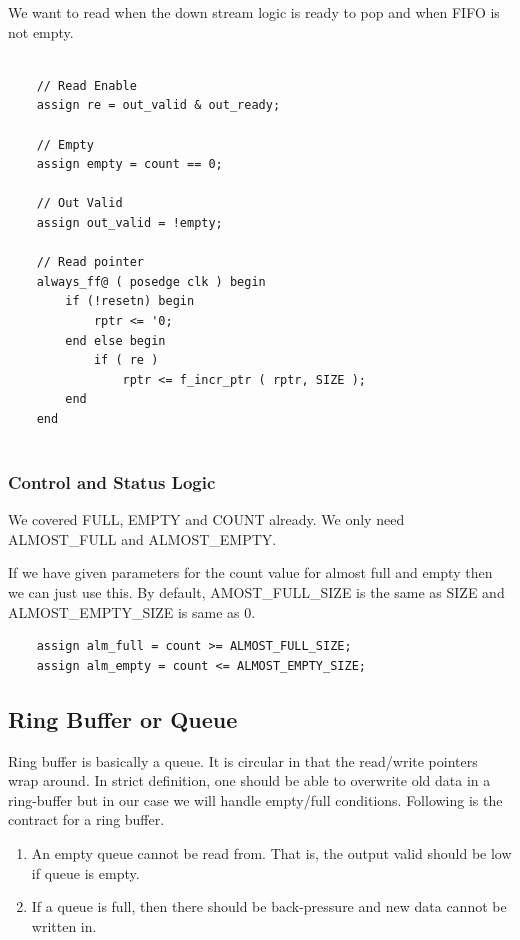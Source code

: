 \documentclass{article}
\begin{document}
We want to read when the down stream logic is ready to pop and when FIFO is not empty.

\begin{Verbatim}

	// Read Enable
	assign re = out_valid & out_ready;
	
	// Empty
	assign empty = count == 0;
	
	// Out Valid
	assign out_valid = !empty;
	
	// Read pointer
	always_ff@ ( posedge clk ) begin 
		if (!resetn) begin
			rptr <= '0;
		end else begin
			if ( re )
				rptr <= f_incr_ptr ( rptr, SIZE );
		end
	end
	
\end{Verbatim}

\subsubsection{Control and Status Logic}

We covered FULL, EMPTY and COUNT already. We only need ALMOST\_FULL and ALMOST\_EMPTY.

If we have given parameters for the count value for almost full and empty then we can just use this. By default, AMOST\_FULL\_SIZE is the same as SIZE and ALMOST\_EMPTY\_SIZE is same as 0.

\begin{Verbatim}
	assign alm_full = count >= ALMOST_FULL_SIZE;
	assign alm_empty = count <= ALMOST_EMPTY_SIZE;
\end{Verbatim}


\subsection{Ring Buffer or Queue}

Ring buffer is basically a queue. It is circular in that the read/write pointers wrap around. In strict definition, one should be able to overwrite old data in a ring-buffer but in our case we will handle empty/full conditions. Following is the contract for a ring buffer.
\begin{enumerate}
	\item An empty queue cannot be read from. That is, the output valid should be low if queue is empty.
	\item If a queue is full, then there should be back-pressure and new data cannot be written in.
\end{enumerate}




\printbibliography
	
\end{document}
